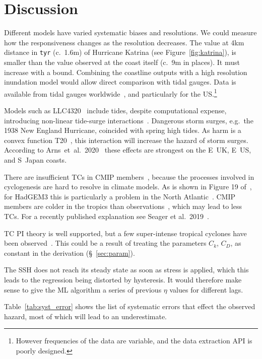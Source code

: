 \section{Discussion}
\label{sec:7_Discussion}

\label{sec:future}

Different models have varied systematic biases
and resolutions. We could measure how
the responsiveness changes as the resolution decreases. The value at 4km distance in
\texttt{tyr} (c.~1.6m) of Hurricane Katrina (see Figure~\ref{fig:katrina}),
is smaller than the value observed at the coast itself (c.~9m in places).
It must increase with a bound.
Combining the coastline outputs with a high resolution inundation model
would allow direct comparison with tidal gauges.
Data is available from tidal gauges worldwide~\cite{tadesse2020data, arns2020non},
and particularly for the US.\footnote{
However frequencies of the data are variable,
and the data extraction API is poorly designed.}

Models such as LLC4320~\cite{Abernathey2017}  include tides,
 despite computational expense,
introducing non-linear tide-surge interactions~\cite{
feng2019characteristics, arns2020non}.
Dangerous storm surges, e.g.~the 1938 New England
Hurricane, coincided with spring high tides.
As harm is a convex function T20~\cite{taleb2019statistical, Taleb2012AntifragileH},
this interaction will increase the hazard of storm surges.
According to Arns~et~al.~2020~\cite{arns2020non}
these effects are strongest on the E~UK,
E~US, and S~Japan coasts.

There are insufficient TCs in CMIP members~\cite{camargo2013global},
because the processes involved
in cyclogenesis are hard to resolve in climate models.
As is shown in Figure 19 of~\cite{williams2018met},
 for HadGEM3 this is particularly a problem in the North Atlantic~\cite{tomassini2017interaction}. %
CMIP members are colder in the tropics than observations~\cite{camargo2013global},
which may lead to less TCs.
For a recently published explanation see Seager et al.~2019~\cite{seager2019strengthening}.


TC PI theory is well supported,
but a few super-intense tropical cyclones have been observed~\cite{camargo2019tropical}.
This could be a result of treating the parameters $C_k$, $C_D$, as constant in the derivation (§~\ref{sec:param}).

The SSH does not reach its steady state as soon as
stress is applied, which this leads
to the regression being distorted by hysteresis.
It would therefore make sense to give the ML algorithm
a series of previous $\eta$ values for different lags.


\label{sec:sys-errors}
Table~\ref{tab:syst_error} shows the list of systematic errors that effect the
observed hazard, most of which will lead to an underestimate.


